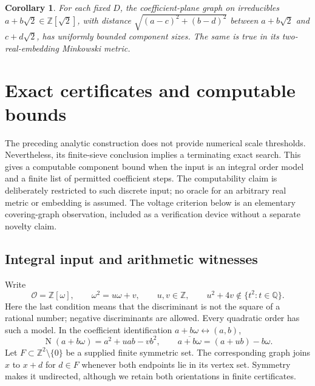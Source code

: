 \documentclass[11pt]{article}
\numberwithin{equation}{section}
\newtheorem{corollary}[theorem]{Corollary}
\theoremstyle{definition}\newtheorem{definition}[theorem]{Definition}
\theoremstyle{remark}\newtheorem{remark}[theorem]{Remark}
\newcommand{\Z}{\mathbb Z}\newcommand{\Q}{\mathbb Q}\newcommand{\R}{\mathbb R}
\newcommand{\OO}{\mathcal O}\newcommand{\PP}{\mathcal P}
\newcommand{\N}{\operatorname{N}}
\begin{document}
\begin{corollary}
For each fixed $D$, the coefficient-plane graph on irreducibles $a+b\sqrt2\in\Z[\sqrt2]$, with distance
$\sqrt{(a-c)^2+(b-d)^2}$ between $a+b\sqrt2$ and $c+d\sqrt2$, has uniformly bounded component sizes. The same is true in its two-real-embedding Minkowski metric.
\end{corollary}

\section{Exact certificates and computable bounds}\label{sec:effective}

The preceding analytic construction does not provide numerical scale thresholds. Nevertheless, its finite-sieve conclusion implies a terminating exact search. This gives a computable component bound when the input is an integral order model and a finite list of permitted coefficient steps. The computability claim is deliberately restricted to such discrete input; no oracle for an arbitrary real metric or embedding is assumed. The voltage criterion below is an elementary covering-graph observation, included as a verification device without a separate novelty claim.

\subsection{Integral input and arithmetic witnesses}

Write
\[
 \OO=\Z[\omega],\qquad \omega^2=u\omega+v,\qquad u,v\in\Z,
 \qquad u^2+4v\notin\{t^2:t\in\Q\}.
\]
Here the last condition means that the discriminant is not the square of a rational number; negative discriminants are allowed. Every quadratic order has such a model. In the coefficient identification $a+b\omega\leftrightarrow(a,b)$,
\begin{equation}\label{eq:integralnorm}
 \N(a+b\omega)=a^2+uab-vb^2,
 \qquad \overline{a+b\omega}=(a+ub)-b\omega.
\end{equation}
Let $F\subset\Z^2\setminus\{0\}$ be a supplied finite symmetric set. The corresponding graph joins $x$ to $x+d$ for $d\in F$ whenever both endpoints lie in its vertex set. Symmetry makes it undirected, although we retain both orientations in finite certificates.
\end{document}
